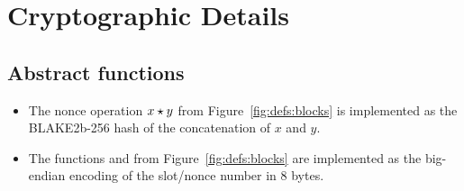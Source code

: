 \section{Cryptographic Details}
\label{sec:crypto-details}

\subsection{Abstract functions}
\label{sec:abstract-funcs-implementation}

\begin{itemize}
  \item The nonce operation $x \star y$ from Figure~\ref{fig:defs:blocks} is implemented
        as the BLAKE2b-256 hash of the concatenation of $x$ and $y$.
  \item The functions  and  from Figure~\ref{fig:defs:blocks} are implemented
        as the big-endian encoding of the slot/nonce number in 8 bytes.
\end{itemize}

